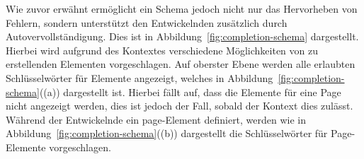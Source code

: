 Wie zuvor erwähnt ermöglicht ein Schema jedoch nicht nur das Hervorheben von Fehlern, sondern unterstützt den Entwickelnden zusätzlich durch Autovervollständigung.
Dies ist in Abbildung~\ref{fig:completion-schema} dargestellt.
Hierbei wird aufgrund des Kontextes verschiedene Möglichkeiten von zu erstellenden Elementen vorgeschlagen.
Auf oberster Ebene werden alle erlaubten Schlüsselwörter für Elemente angezeigt, welches in Abbildung~\ref{fig:completion-schema}((a)) dargestellt ist.
Hierbei fällt auf, dass die Elemente für eine Page nicht angezeigt werden, dies ist jedoch der Fall, sobald der Kontext dies zulässt.
Während der Entwickelnde ein page-Element definiert, werden wie in Abbildung~\ref{fig:completion-schema}((b)) dargestellt die Schlüsselwörter für Page-Elemente vorgeschlagen.

